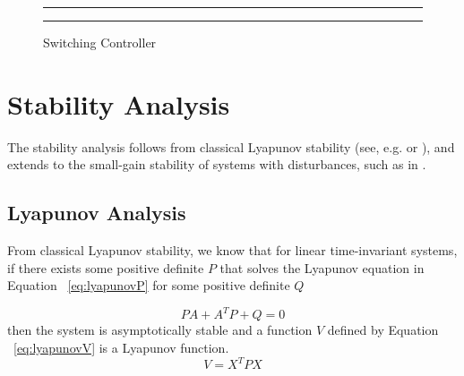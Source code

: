 \documentclass[conference]{IEEEtran}
\begin{document}
\begin{figure}[h!]
\centering
  \hrule
	{}
  \hrule
  \caption{Switching Controller}
  \label{fig:switchingController}
\end{figure}

\section{Stability Analysis}

The stability analysis follows from classical Lyapunov stability (see, e.g. \cite{Chen1999} or \cite{Khalil2002}), and extends to the small-gain stability of systems with disturbances, such as in \cite{LiberzonQuantDelay2006}.

\subsection{Lyapunov Analysis}

From classical Lyapunov stability, we know that for linear time-invariant systems, if there exists some positive definite $P$ that solves the Lyapunov equation in Equation ~\ref{eq:lyapunovP} for some positive definite $Q$

\begin{equation}
PA+A^TP+Q=0
\label{eq:lyapunovP}
\end{equation} then the system is asymptotically stable and a function $V$ defined by Equation ~\ref{eq:lyapunovV} is a Lyapunov function.
\begin{equation}
V=X^TPX
\label{eq:lyapunovV}
\end{equation}
\end{document}
